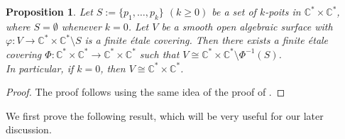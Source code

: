 \documentclass[12pt,reqno,twoside]{amsart}
\newtheorem{prop}[theorem]{Proposition}
\theoremstyle{definition}
\numberwithin{equation}{section}
\newcommand{\C}{\mathbb{C}}
\begin{document}
\begin{prop}
    Let $S:=\{p_1,\ldots, p_k\}$ $(k\geq 0)$ be a set of $k$-poits in $\C^*\times \C^*$, where $S=\emptyset$ whenever $k=0$. Let $V$ be a smooth open algebraic surface with $\varphi: V\to \C^*\times \C^*\setminus S$ is a finite {\'e}tale covering. Then there exists a finite {\'e}tale covering $\Phi: \C^*\times \C^*\to \C^*\times \C^*$ such that $V\cong \C^*\times \C^*\setminus \Phi^{-1}(S)$.\\
    In particular, if $k=0$, then $V\cong \C^*\times \C^*$. 
\end{prop}
\begin{proof}
   The proof follows using the same idea of the proof of \cite[Lemma 3.3]{Fur1989}.  
\end{proof}

We first prove the following result, which will be very useful for our later discussion.
\end{document}

